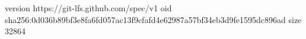 version https://git-lfs.github.com/spec/v1
oid sha256:0d036b89bf3e8fa6fd057ac13f9cfafd4e62987a57bf34eb3d9fe1595dc896ad
size 32864
